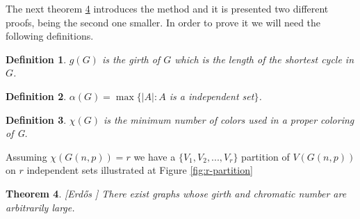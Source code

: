 \documentclass[12pt,twoside,a4paper]{book}
\numberwithin{equation}{section}
\newtheorem{theorem}             {Theorem}[section]
\newtheorem{definition}	[theorem] {Definition}
\theoremstyle{remark}
\begin{document}


The next theorem \ref{erdoss} introduces the method and it is presented two different proofs, being the second one smaller. In order to prove it we will need the following definitions.

\begin{definition}\label{def:girth}
$g(G)$ is the girth of $G$ which is the length of the shortest cycle in $G$. 
\end{definition}
\begin{definition}\label{def:independencenumber}
$\alpha(G) = \max\{|A|: A$ is a independent set$\}$.
\end{definition}
\begin{definition}\label{def:chromaticnumber}
$\chi(G)$ is the minimum number of colors used in a proper coloring of G.
\end{definition}
Assuming $\chi(G(n,p)) = r$ we have a $\{V_1,V_2,...,V_r\}$ partition of $V(G(n,p))$ on $r$ independent sets illustrated at Figure \ref{fig:r-partition}


\begin{theorem}\label{erdoss} [{Erd\H{o}s \cite{Er59}}] There exist graphs whose girth and chromatic number are arbitrarily large.
\end{theorem}
\end{document}
